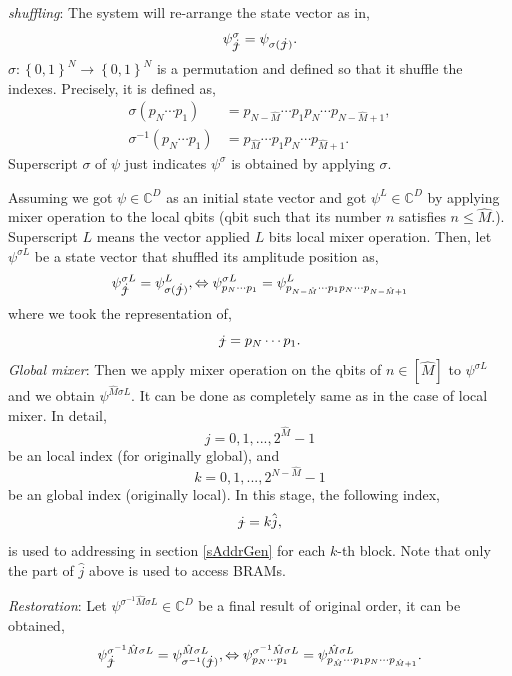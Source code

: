 \documentclass[a4paper]{article}
\newcommand{\eqlabel}[1]{\label{#1}}
\newcommand{\br}[1]{\left(#1\right)}
\newcommand{\cbr}[1]{\left\{#1\right\}}
\newcommand{\MidBar}[1]{{\ooalign{\hfil$#1$\hfil\cr\kern0.08em--\hfil\cr}}}
\newcommand{\sC}{\mathbb{C}}
\newcommand{\hatj}{{\hat{j}}}
\newcommand{\jbar}{{\MidBar{j}}}
\newcommand{\hatM}{{\hat{M}}}
\begin{document}
\textit{shuffling}: 
The system will re-arrange the state vector as in,
\begin{equation}
    \eqlabel{esigma}
    \psi^{\sigma}_\jbar = \psi_{\sigma(\jbar)}.
\end{equation}
\(\sigma:\cbr{0,1}^N\to\cbr{0,1}^N\) is a permutation and defined so that it shuffle the indexes. Precisely, it is defined as,
\begin{align*}
    \sigma\br{p_N \cdots p_1} &= p_{N-\hatM}\cdots p_1 p_N\cdots p_{N-\hatM+1},\\
    \sigma^{-1}\br{p_N\cdots p_1} &= p_{\hatM}\cdots p_1 p_N\cdots p_{\hatM+1}.
\end{align*}
Superscript \(\sigma\) of \(\psi\) just indicates \(\psi^\sigma\) is obtained by applying \(\sigma\). 

Assuming we got \(\psi\in \sC^D\) as an initial state vector and got \(\psi^L\in\sC^D\) by applying mixer operation to the local qbits (qbit such that its number \(n\) satisfies \(n\leq \hatM\).). Superscript \(L\) means the vector applied \(L\) bits local mixer operation. Then, let \(\psi^{\sigma L}\) be a state vector that shuffled its amplitude position as,
\begin{equation}
    \eqlabel{eshuffle}
    \psi^{\sigma L}_\jbar = \psi^L_{\sigma(\jbar)} , \Leftrightarrow\psi^{\sigma L}_{p_N\cdots p_1}= \psi^L_{p_{N-\hatM}\cdots p_1 p_N\cdots p_{N-\hatM+1}}
\end{equation}
where we took the representation of,
\[
\jbar = p_N\cdots p_1.
\]
\textit{Global mixer}: 
Then we apply mixer operation on the qbits of \(n \in[\hatM]\) to \(\psi^{\sigma L}\) and we obtain \(\psi^{\hatM\sigma L}\). It can be done as completely same as in the case of local mixer. In detail, 
\[j=0,1,...,2^{\hatM}-1\] be an local index (for originally global), 
and \[k=0,1,...,2^{N-\hatM}-1\]
 be an global index (originally local). In this stage, the following index,
\[
\jbar = k\hatj,
\] 
is used to addressing in section \ref{sAddrGen} for each \(k\)-th block. Note that only the part of \(\hatj\) above is used to access BRAMs.

\textit{Restoration}: Let \(\psi^{\sigma^{-1}\hatM\sigma L}\in\sC^D\) be a final result of original order, it can be obtained,
\begin{equation}
    \eqlabel{ereverseshuffle}
\psi^{\sigma^{-1}\hatM\sigma L}_\jbar = \psi^{\hatM\sigma L}_{\sigma^{-1}(\jbar)}, \Leftrightarrow \psi^{\sigma^{-1}\hatM\sigma L}_{p_N\cdots p_1}= \psi^{\hatM\sigma L}_{p_{\hatM}\cdots p_1 p_N\cdots p_{\hatM+1}}.
\end{equation}
\end{document}

